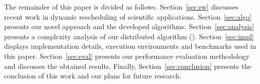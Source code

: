 The remainder of this paper is divided as follows.
Section~\ref{sec:rw} discusses recent work in dynamic rescheduling of scientific applications. 
Section~\ref{sec:algo} presents our novel approach and the developed algorithms. 
Section~\ref{sec:analysis} presents a complexity analysis of our distributed algorithm (\packdrop). 
Section~\ref{sec:impl} displays implementation details, execution environments and benchmarks used in this paper. 
Section~\ref{sec:eval} presents our performance evaluation methodology and discusses the obtained results. 
Finally, Section~\ref{sec:conclusion} presents the conclusion of this work and our plans for future research.


